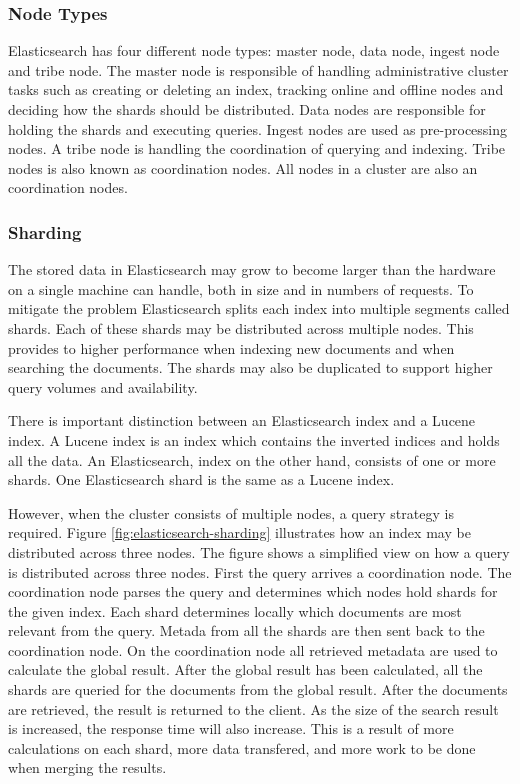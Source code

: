 \subsubsection{Node Types}
Elasticsearch has four different node types: master node, data node, ingest node and tribe node.
The master node is responsible of handling administrative cluster tasks such as
creating or deleting an index, tracking online and offline nodes and deciding how the shards should be distributed.
Data nodes are responsible for holding the shards and executing queries.
Ingest nodes are used as pre-processing nodes.
A tribe node is handling the coordination of querying and indexing.
Tribe nodes is also known as coordination nodes.
All nodes in a cluster are also an coordination nodes.

\subsubsection{Sharding}
The stored data in Elasticsearch may grow to become larger than the hardware on a single machine can handle,
both in size and in numbers of requests.
To mitigate the problem Elasticsearch splits each index into multiple segments called shards.
Each of these shards may be distributed across multiple nodes.
This provides to higher performance when indexing new documents and when searching the documents.
The shards may also be duplicated to support higher query volumes and availability.

There is important distinction between an Elasticsearch index and a Lucene index.
A Lucene index is an index which contains the inverted indices and holds all the data.
An Elasticsearch, index on the other hand, consists of one or more shards.
One Elasticsearch shard is the same as a Lucene index.

However, when the cluster consists of multiple nodes, a query strategy is required.
Figure \ref{fig:elasticsearch-sharding} illustrates how an index may be distributed across three nodes.
The figure shows a simplified view on how a query is distributed across three nodes.
First the query arrives a coordination node.
The coordination node parses the query and determines which nodes hold shards for the given index.
Each shard determines locally which documents are most relevant from the query.
Metada from all the shards are then sent back to the coordination node.
On the coordination node all retrieved metadata are used to calculate the global result.
After the global result has been calculated,
all the shards are queried for the documents from the global result.
After the documents are retrieved, the result is returned to the client.
As the size of the search result is increased, the response time will also increase.
This is a result of more calculations on each shard,
more data transfered,
and more work to be done when merging the results.

